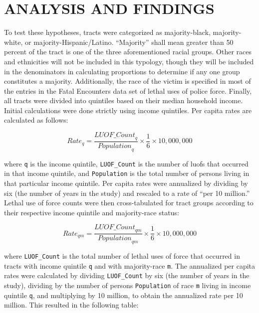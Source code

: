 \documentclass[12pt]{article}
\begin{document}
\section{ANALYSIS AND FINDINGS}

To test these hypotheses, tracts were categorized as majority-black, majority-white, or majority-Hispanic/Latino. “Majority” shall mean greater than 50 percent of the tract is one of the three aforementioned racial groups. Other races and ethnicities will not be included in this typology, though they will be included in the denominators in calculating proportions to determine if any one group constitutes a majority. Additionally, the race of the victim is specified in most of the entries in the Fatal Encounters data set of lethal uses of police force. Finally, all tracts were divided into quintiles based on their median household income. Initial calculations were done strictly using income quintiles. Per capita rates are calculated as follows:

\begin{equation}
{Rate}_q=\frac{{LUOF\_Count}_q}{{Population}_q}\times\frac{1}{6}\times10,000,000
\label{eq:quintile_rate}
\end{equation}

\noindent{}where \texttt{q} is the income quintile, \texttt{LUOF\_Count} is the number of \acrshort{luof}s that occurred in that income quintile, and \texttt{Population} is the total number of persons living in that particular income quintile. Per capita rates were annualized by dividing by six (the number of years in the study) and rescaled to a rate of “per 10 million.” Lethal use of force counts were then cross-tabulated for tract groups according to their respective income quintile and majority-race status:

\begin{equation}
{Rate}_{qm}=\frac{{LUOF\_Count}_{qm}}{{Population}_{qm}}\times\frac{1}{6}\times10,000,000
\label{eq:quintile_majority_rate}
\end{equation}

\noindent{}where \texttt{LUOF\_Count} is the total number of lethal uses of force that occurred in tracts with income quintile \texttt{q} and with majority-race \texttt{m}. The annualized per capita rates were calculated by dividing \texttt{LUOF\_Count} by six (the number of years in the study), dividing by the number of persons \texttt{Population} of race \texttt{m} living in income quintile \texttt{q}, and multiplying by 10 million, to obtain the annualized rate per 10 million. This resulted in the following table:
\end{document}
